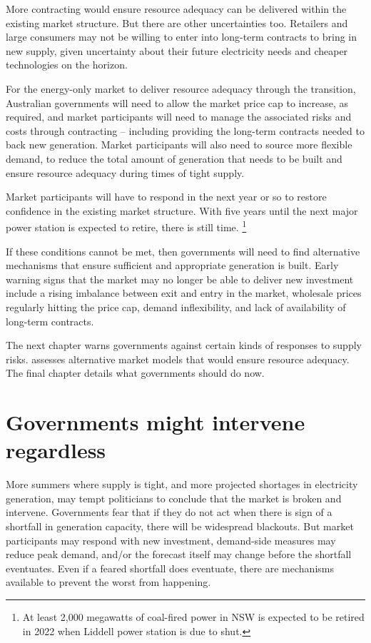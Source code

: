 \documentclass[FrontPage]{grattan}
\begin{document}
More contracting would ensure resource adequacy can be delivered within the existing market structure. But there are other uncertainties too. Retailers and large consumers may not be willing to enter into long-term contracts to bring in new supply, given uncertainty about their future electricity needs and cheaper technologies on the horizon.

For the energy-only market to deliver resource adequacy through the transition, Australian governments will need to allow the market price cap to increase, as required, and market participants will need to manage the associated risks and costs through contracting -- including providing the long-term contracts needed to back new generation. Market participants will also need to source more flexible demand, to reduce the total amount of generation that needs to be built and ensure resource adequacy during times of tight supply.

Market participants will have to respond in the next year or so to restore confidence in the existing market structure. With five years until the next major power station is expected to retire, there is still time.%
\footnote{At least 2,000 megawatts of coal-fired power in NSW is expected to be retired in 2022 when Liddell power station is due to shut.}

If these conditions cannot be met, then governments will need to find alternative mechanisms that ensure sufficient and appropriate generation is built. Early warning signs that the market may no longer be able to deliver new investment include a rising imbalance between exit and entry in the market, wholesale prices regularly hitting the price cap, demand inflexibility, and lack of availability of long-term contracts.

The next chapter warns governments against certain kinds of responses to supply risks.  assesses alternative market models that would ensure resource adequacy. The final chapter details what governments should do now.


\chapter{Governments might intervene regardless}\label{chap:governments-may-intervene-regardless}
More summers where supply is tight, and more projected shortages in electricity generation, may tempt politicians to conclude that the market is broken and intervene. Governments fear that if they do not act when there is sign of a shortfall in generation capacity, there will be widespread blackouts. But market participants may respond with new investment, demand-side measures may reduce peak demand, and/or the forecast itself may change before the shortfall eventuates. Even if a feared shortfall does eventuate, there are mechanisms available to prevent the worst from happening.
\end{document}
